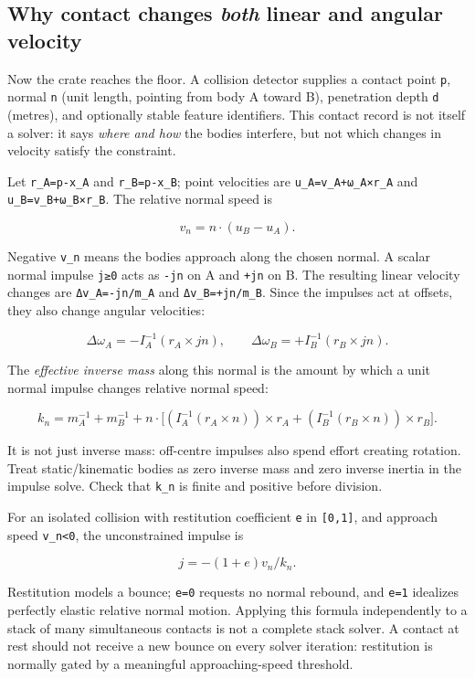 \subsection{\texorpdfstring{Why contact changes \emph{both} linear and angular velocity}{Why contact changes both linear and angular velocity}}\label{06-engine-ii-ch033-why-contact-changes-both-linear-and-angular-velocity}

Now the crate reaches the floor. A collision detector supplies a contact point \texttt{p}, normal \texttt{n} (unit length, pointing from body A toward B), penetration depth \texttt{d} (metres), and optionally stable feature identifiers. This contact record is not itself a solver: it says \emph{where and how} the bodies interfere, but not which changes in velocity satisfy the constraint.

Let \texttt{r\_A=p-x\_A} and \texttt{r\_B=p-x\_B}; point velocities are \texttt{u\_A=v\_A+ω\_A×r\_A} and \texttt{u\_B=v\_B+ω\_B×r\_B}. The relative normal speed is

\[
v_n=n\cdot(u_B-u_A).
\]

Negative \texttt{v\_n} means the bodies approach along the chosen normal. A scalar normal impulse \texttt{j≥0} acts as \texttt{-jn} on A and \texttt{+jn} on B. The resulting linear velocity changes are \texttt{Δv\_A=-jn/m\_A} and \texttt{Δv\_B=+jn/m\_B}. Since the impulses act at offsets, they also change angular velocities:

\[
\Delta\omega_A=-I_A^{-1}(r_A\times jn),\qquad
\Delta\omega_B=+I_B^{-1}(r_B\times jn).
\]

The \emph{effective inverse mass} along this normal is the amount by which a unit normal impulse changes relative normal speed:

\[
k_n=m_A^{-1}+m_B^{-1}
+n\cdot\Big[
(I_A^{-1}(r_A\times n))\times r_A
+(I_B^{-1}(r_B\times n))\times r_B
\Big].
\]

It is not just inverse mass: off-centre impulses also spend effort creating rotation. Treat static/kinematic bodies as zero inverse mass and zero inverse inertia in the impulse solve. Check that \texttt{k\_n} is finite and positive before division.

For an isolated collision with restitution coefficient \texttt{e} in \texttt{{[}0,1{]}}, and approach speed \texttt{v\_n\textless{}0}, the unconstrained impulse is

\[
j=-(1+e)v_n/k_n.
\]

Restitution models a bounce; \texttt{e=0} requests no normal rebound, and \texttt{e=1} idealizes perfectly elastic relative normal motion. Applying this formula independently to a stack of many simultaneous contacts is not a complete stack solver. A contact at rest should not receive a new bounce on every solver iteration: restitution is normally gated by a meaningful approaching-speed threshold.

